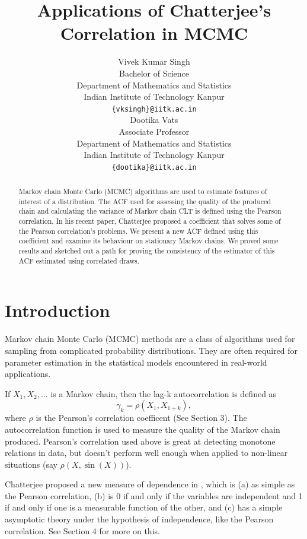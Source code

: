 \documentclass{article}
\title{Applications of Chatterjee's Correlation in MCMC
}
\author{
  Vivek Kumar Singh \\
  Bachelor of Science \\
  Department of Mathematics and Statistics \\
  Indian Institute of Technology Kanpur \\
  \texttt{\{vksingh\}@iitk.ac.in} \\
   \And
  Dootika Vats \\
  Associate Professor \\
  Department of Mathematics and Statistics \\
  Indian Institute of Technology Kanpur \\
 \texttt{\{dootika\}@iitk.ac.in}
}
\begin{document}
\maketitle
\begin{abstract}
    Markov chain Monte Carlo (MCMC) algorithms are used to estimate features of interest of a distribution.
    The ACF used for assessing the quality of the produced chain and calculating the variance of Markov chain CLT is defined using the Pearson correlation.
    In his recent paper, Chatterjee proposed a coefficient that solves some of the Pearson correlation's problems.
    We present a new ACF defined using this coefficient and examine its behaviour on stationary Markov chains.
    We proved some results and sketched out a path for proving the consistency of the estimator of this ACF estimated using correlated draws.
\end{abstract}
\section{Introduction}

	Markov chain Monte Carlo (MCMC) methods are a class of algorithms used for sampling from complicated probability distributions.
	They are often required for parameter estimation in the statistical models encountered in real-world applications.

	If $X_1, X_2, \dots$ is a Markov chain,
	then the lag-k autocorrelation is defined as
	$$\gamma_k = \rho(X_1, X_{1+k}),$$
	where $\rho$ is the Pearson's correlation coefficent (See Section 3).
	The autocorrelation function is used to measure the quality of the Markov chain produced.
	Pearson's correlation used above is great at detecting monotone relations in data,
	but doesn't perform well enough when applied to non-linear situations (say $\rho(X, \sin(X))$).

	Chatterjee proposed a new measure of dependence in \cite{chatterjee2020sourav}, which is
	(a) as simple as the Pearson correlation,
	(b) is 0 if and only if the variables are independent and 1 if and only if one is a measurable function of the other, and
	(c) has a simple asymptotic theory under the hypothesis of independence, like the Pearson correlation.
	See Section 4 for more on this.
\end{document}
